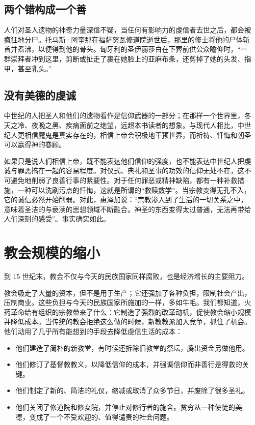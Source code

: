 \subsection{两个错构成一个善}
人们对圣人遗物的神奇力量深信不疑，当任何有影响力的虔信者去世之后，都会被疯狂地分尸。托马斯·阿奎那在福萨努瓦修道院逝世后，那里的修士将他的尸体斩首并煮沸，以便得到他的骨头。匈牙利的圣伊丽莎白在下葬前供公众瞻仰时，“一群崇拜者冲到这里，剪断或扯走了裹在她脸上的亚麻布条，还剪掉了她的头发、指甲，甚至乳头。”

\subsection{没有美德的虔诚}
中世纪的人把圣人和他们的遗物看作是信仰武器的一部分；在那样一个世界里，冬天之冷、夜晚之黑、疾病面前之绝望，远超本书读者的想象。与现代人相比，中世纪人更相信魔鬼是真实存在的，相信上帝会积极地干预世界，而祈祷、忏悔和朝圣可以赢得神的眷顾。

如果只是说人们相信上帝，既不能表达他们信仰的强度，也不能表达中世纪人把虔诚与罪恶搞在一起的容易程度。对仪式、典礼和圣事的功效的信仰无处不在，这不可避免地削弱了良善行事的紧要性。对于任何罪恶或精神缺陷，都有一种补救措施，一种可以洗刷污点的忏悔，这就是所谓的“救赎数学”。当宗教变得无孔不入，它的诚信必然开始削弱。对此，惠泽加说：“宗教渗入到了生活的一切关系之中，意味着圣洁的与亵渎的思想领域不断融合。神圣的东西变得太过普通，无法再带给人们深刻的感受”。事实确实如此。

\section{教会规模的缩小}
到 15 世纪末，教会不仅与今天的民族国家同样腐败，也是经济增长的主要阻力。

教会吸走了大量的资本，但不是用于生产；它还强加了各种负担，限制社会产出，压制商业。这些负担与今天的民族国家所施加的一样，多如牛毛。我们都知道，火药革命给有组织的宗教带来了什么：它制造了强烈的改革动机，促使教会缩小规模并降低成本。当传统的教会拒绝这么做的时候，新教教派加入竞争，抓住了机会。他们动用了几乎所有能想到的手段去降低虔信生活的成本：

\begin{itemize}
    \item 他们建造了简朴的新教堂，有时候还拆除旧教堂的祭坛，腾出资金另做他用。
    \item 他们修订了基督教教义，以降低信仰的成本，并强调信仰而非善行是得救的关键。
    \item 他们制定了新的、简洁的礼仪，缩减或取消了众多节日，并废除了很多圣礼。
    \item 他们关闭了修道院和修女院，并停止对修行者的施舍。贫穷从一种使徒的美德，变成了一个不受欢迎的、值得谴责的社会问题。
\end{itemize}

